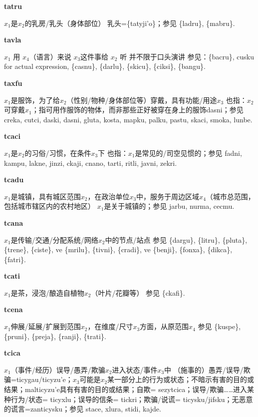 \documentclass[notitlepage,twocolumn,a4paper,10pt]{book}
\begin{document}
{\sffamily\bfseries tatru}\enspace {\ttfamily\bfseries[tat]}  $x_1$是$x_2$的乳房\slash{}乳头（身体部位） \textemdash{} 乳头=\{tatyji'o\}；参见 \{ladru\}, \{mabru\}.

{\sffamily\bfseries tavla}\enspace {\ttfamily\bfseries[tav     ta'a]}  $x_{1}$ 用 $x_{4}$（语言）来说 $x_{3}$这件事给 $x_{2}$ 听 \textemdash{} 并不限于口头演讲 参见：\{bacru\}, cusku for actual expression, \{casnu\}, \{darlu\}, \{skicu\}, \{ciksi\}, \{bangu\}.

{\sffamily\bfseries taxfu}\enspace {\ttfamily\bfseries[taf     ta'u]}  $x_1$是服饰，为了给$x_2$（性别\slash{}物种\slash{}身体部位等）穿戴，具有功能\slash{}用途$x_3$ \textemdash{} 也指：$x_2$可穿戴$x_1$；指可用作服饰的物体，而非那些正好被穿在身上的服饰{dasni}；参见 {creka}, {cutci}, {daski}, {dasni}, {gluta}, {kosta}, {mapku}, {palku}, {pastu}, {skaci}, {smoka}, {lunbe}.

{\sffamily\bfseries tcaci}\enspace {\ttfamily\bfseries[cac]}  $x_1$是$x_2$的习俗\slash{}习惯，在条件$x_3$下 \textemdash{} 也指：$x_1$是常见的\slash{}司空见惯的；参见 {fadni}, {kampu}, {lakne}, {jinzi}, {ckaji}, {cnano}, {tarti}, {ritli}, {javni}, {zekri}.

{\sffamily\bfseries tcadu}\enspace {\ttfamily\bfseries[    tca]}  $x_1$是城镇，具有城区范围$x_2$，在政治单位$x_3$中，服务于周边区域$x_4$（城市总范围，包括城市辖区内的农村地区） \textemdash{} $x_1$是关于城镇的；参见 {jarbu}, {nurma}, {cecmu}.

{\sffamily\bfseries tcana} $x_1$是传输\slash{}交通\slash{}分配系统\slash{}网络$x_2$中的节点\slash{}站点 \textemdash{} 参见 \{dargu\}, \{litru\}, \{pluta\}, \{trene\}, \{ciste\}, ve \{mrilu\}, \{tivni\}, \{cradi\}, ve \{benji\}, \{fonxa\}, \{dikca\}, \{fatri\}.

{\sffamily\bfseries tcati} $x_1$是茶，浸泡\slash{}酿造自植物$x_2$（叶片\slash{}花瓣等） \textemdash{} 参见 \{ckafi\}.

{\sffamily\bfseries tcena}\enspace {\ttfamily\bfseries[ten]}  $x_1$伸展\slash{}延展\slash{}扩展到范围$x_2$，在维度\slash{}尺寸$x_3$方面，从原范围$x_4$ \textemdash{} 参见 \{kuspe\}, \{pruni\}, \{preja\}, \{ranji\}, \{trati\}.

{\sffamily\bfseries tcica}\enspace {\ttfamily\bfseries[tic]}  $x_1$（事件\slash{}经历）误导\slash{}愚弄\slash{}欺骗$x_2$进入状态\slash{}事件$x_3$中 \textemdash{} （施事的）愚弄\slash{}误导\slash{}欺骗={ticygau}\slash{}{ticyzu'e}；$x_3$可能是$x_2$某一部分上的行为或状态；不暗示有害的目的或结果；{malticyzu'e}具有有害的目的或结果；自欺= {sezytcica}；误导\slash{}欺骗……进入某种行为\slash{}状态= {ticyxlu}；误导的信条= {tickri}；欺骗\slash{}说谎= {ticysku}\slash{}{jifsku}；无恶意的谎言={zanticysku}；参见 {stace}, {xlura}, {stidi}, {kajde}.
\end{document}
